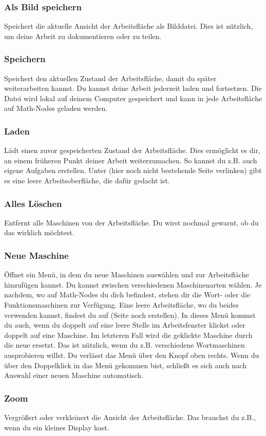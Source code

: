 \documentclass[12pt]{report}
\begin{document}
\subsubsection{Als Bild speichern}
Speichert die aktuelle Ansicht der Arbeitsfläche als Bilddatei. Dies ist nützlich, um deine Arbeit zu dokumentieren oder zu teilen.
\subsubsection{Speichern}
Speichert den aktuellen Zustand der Arbeitsfläche, damit du später weiterarbeiten kannst. Du kannst deine Arbeit jederzeit laden und fortsetzen. Die Datei wird lokal auf deinem Computer gespeichert und kann in jede Arbeitsfläche auf Math-Nodes geladen werden.
\subsubsection{Laden}
Lädt einen zuvor gespeicherten Zustand der Arbeitsfläche. Dies ermöglicht es dir, an einem früheren Punkt deiner Arbeit weiterzumachen. So kannst du z.B. auch eigene Aufgaben erstellen. Unter (hier noch nicht bestehende Seite verlinken) gibt es eine leere Arbeitsoberfläche, die dafür gedacht ist.
\subsubsection{Alles Löschen}
Entfernt alle Maschinen von der Arbeitsfläche. Du wirst nochmal gewarnt, ob du das wirklich möchtest.
\subsubsection{Neue Maschine}
Öffnet ein Menü, in dem du neue Maschinen auswählen und zur Arbeitsfläche hinzufügen kannst. Du kannst zwischen verschiedenen Maschinenarten wählen. Je nachdem, wo auf Math-Nodes du dich befindest, stehen dir die Wort- oder die Funktionsmaschinen zur Verfügung. Eine leere Arbeitsfläche, wo du beides verwenden kannst, findest du auf (Seite noch erstellen). In dieses Menü kommst du auch, wenn du doppelt auf eine leere Stelle im Arbeitsfenster klickst oder doppelt auf eine Maschine. Im letzteren Fall wird die geklickte Maschine durch die neue ersetzt. Das ist nützlich, wenn du z.B. verschiedene Wortmaschinen ausprobieren willst. Du verlässt das Menü über den Knopf oben rechts. Wenn du über den Doppelklick in das Menü gekommen bist, schließt es sich auch nach Auswahl einer neuen Maschine automatisch.
\subsubsection{Zoom}
Vergrößert oder verkleinert die Ansicht der Arbeitsfläche. Das brauchst du z.B., wenn du ein kleines Display hast.
\end{document}
